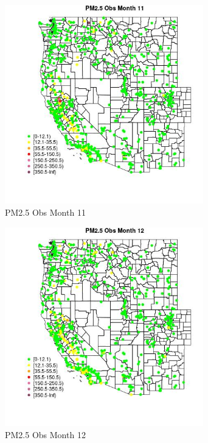\begin{figure} 
\centering  
\includegraphics[width=0.77\textwidth]{Code_Outputs/Report_ML_input_PM25_Step4_part_f_de_duplicated_aveswNAs_MapObsMo11PM25_Obs.jpg} 
\caption{\label{fig:Report_ML_input_PM25_Step4_part_f_de_duplicated_aveswNAsMapObsMo11PM25_Obs}PM2.5 Obs Month 11} 
\end{figure} 
 

\begin{figure} 
\centering  
\includegraphics[width=0.77\textwidth]{Code_Outputs/Report_ML_input_PM25_Step4_part_f_de_duplicated_aveswNAs_MapObsMo12PM25_Obs.jpg} 
\caption{\label{fig:Report_ML_input_PM25_Step4_part_f_de_duplicated_aveswNAsMapObsMo12PM25_Obs}PM2.5 Obs Month 12} 
\end{figure} 
 

